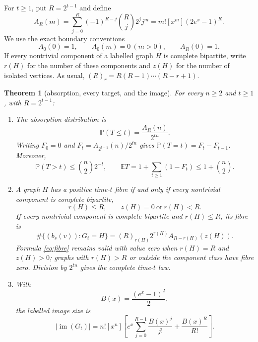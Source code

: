 \documentclass[a4paper,10pt]{amsart}
\newtheorem{theorem}{Theorem}
\theoremstyle{remark}
\newcommand{\Prob}{\mathbb P}
\newcommand{\E}{\mathbb E}
\begin{document}
For $t\geq1$, put $R=2^{t-1}$ and define
\begin{equation}\label{eq:A}
 A_R(m)=\sum_{j=0}^{R}(-1)^{R-j}\binom Rj2^j j^m
       =m![x^m](2e^x-1)^R.
\end{equation}
We use the exact boundary conventions
\begin{equation}\label{eq:A-boundary}
 A_0(0)=1,\qquad A_0(m)=0\ (m>0),\qquad A_R(0)=1.
\end{equation}
If every nontrivial component of a labelled graph $H$ is complete bipartite,
write $r(H)$ for the number of these components and $z(H)$ for the number of
isolated vertices.  As usual, $(R)_r=R(R-1)\cdots(R-r+1)$.

\begin{theorem}[absorption, every target, and the image]\label{thm:main}
For every $n\geq2$ and $t\geq1$, with $R=2^{t-1}$:
\begin{enumerate}
\item The absorption distribution is
\begin{equation}\label{eq:cdf}
 \Prob(T\leq t)=\frac{A_R(n)}{2^{tn}}.
\end{equation}
Writing $F_0=0$ and $F_t=A_{2^{t-1}}(n)/2^{tn}$ gives
$\Prob(T=t)=F_t-F_{t-1}$.  Moreover,
\begin{equation}\label{eq:tail-mean}
 \Prob(T>t)\leq\binom n2 2^{-t},\qquad
 \E T=1+\sum_{t\geq1}(1-F_t)\leq1+\binom n2.
\end{equation}
\item A graph $H$ has a positive time-$t$ fibre if and only if every
nontrivial component is complete bipartite,
\begin{equation}\label{eq:image-condition}
 r(H)\leq R,
 \qquad
 z(H)=0\ \text{or}\ r(H)<R.
\end{equation}
If every nontrivial component is complete bipartite and $r(H)\leq R$, its
fibre is
\begin{equation}\label{eq:fibre}
 \#\{(b_s(v)):G_t=H\}
   =(R)_{r(H)}2^{r(H)}A_{R-r(H)}(z(H)).
\end{equation}
Formula \eqref{eq:fibre} remains valid with value zero when
$r(H)=R$ and $z(H)>0$; graphs with $r(H)>R$ or outside the component class
have fibre zero.  Division by $2^{tn}$ gives the complete time-$t$ law.
\item With
\begin{equation}\label{eq:B}
 B(x)=\frac{(e^x-1)^2}{2},
\end{equation}
the labelled image size is
\begin{equation}\label{eq:image-egf}
 |\operatorname{im}(G_t)|
 =n![x^n]\left[
 e^x\sum_{j=0}^{R-1}\frac{B(x)^j}{j!}
 +\frac{B(x)^R}{R!}\right].
\end{equation}
\end{enumerate}
\end{theorem}
\end{document}
